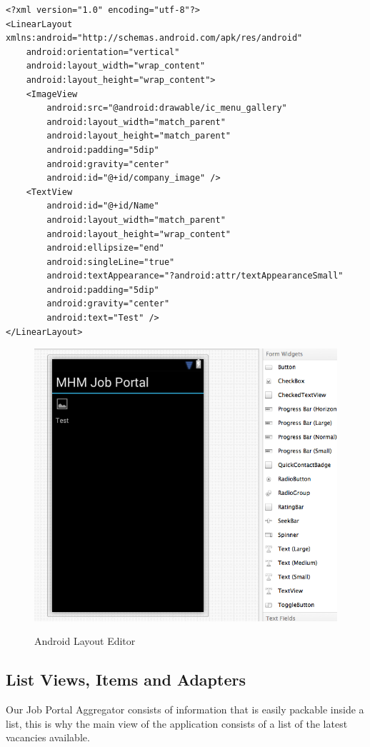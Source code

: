 \lstset{language=XML}
\begin{lstlisting}[frame=lt,caption=Company.axml, label={list:and_xml}]
<?xml version="1.0" encoding="utf-8"?>
<LinearLayout xmlns:android="http://schemas.android.com/apk/res/android"
    android:orientation="vertical"
    android:layout_width="wrap_content"
    android:layout_height="wrap_content">
    <ImageView
        android:src="@android:drawable/ic_menu_gallery"
        android:layout_width="match_parent"
        android:layout_height="match_parent"
        android:padding="5dip"
        android:gravity="center"
        android:id="@+id/company_image" />
    <TextView
        android:id="@+id/Name"
        android:layout_width="match_parent"
        android:layout_height="wrap_content"
        android:ellipsize="end"
        android:singleLine="true"
        android:textAppearance="?android:attr/textAppearanceSmall"
        android:padding="5dip"
        android:gravity="center"
        android:text="Test" />
</LinearLayout>
\end{lstlisting}


\begin{figure}[H]
    \begin{center}
        {\includegraphics[width=0.75\linewidth]{gfx/and_view}}
        \caption[Android Layout Editor]{Android Layout Editor}\label{fig:and_layout}
    \end{center}
\end{figure}

\subsection{List Views, Items and Adapters}
Our Job Portal Aggregator consists of information that is easily packable inside a list, this is why the main view of the application consists of a list of the latest vacancies available.

